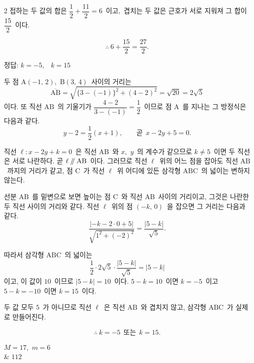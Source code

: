 \documentclass[10pt,fleqn]{article}
\newcommand{\para}{\mathbin{/\mskip-5mu/}}
\begin{document}
\begin{multicols*}{2}
접하는 두 값의 합은 $\dfrac12+\dfrac{11}{2}=6$\ 이고,\ 겹치는 두 값은 근호가 서로 지워져 그 합이 $\dfrac{15}{2}$\ 이다.

$$\therefore\ 6+\dfrac{15}{2}=\dfrac{27}{2}.$$


\begin{dmanswerbox}
정답: $k=-5$,\ \ $k=15$
\end{dmanswerbox}

두 점 $\mathrm{A}(-1,\,2)$,\ $\mathrm{B}(3,\,4)$\ 사이의 거리는
$$\overline{\mathrm{AB}}=\sqrt{\{3-(-1)\}^{2}+(4-2)^{2}}=\sqrt{20}=2\sqrt5$$
이다. 또 직선 $\mathrm{AB}$\ 의 기울기가 $\dfrac{4-2}{3-(-1)}=\dfrac12$\ 이므로 점 $\mathrm{A}$\ 를 지나는 그 방정식은 다음과 같다.
$$y-2=\dfrac12(x+1),\qquad \text{곧}\ \ x-2y+5=0.$$

직선 $\ell:x-2y+k=0$\ 은 직선 $\mathrm{AB}$\ 와 $x$,\ $y$\ 의 계수가 같으므로 $k\ne 5$\ 이면 두 직선은 서로 나란하다. 곧 $\ell\para\mathrm{AB}$\ 이다. 그러므로 직선 $\ell$\ 위의 어느 점을 잡아도 직선 $\mathrm{AB}$\ 까지의 거리가 같고, 점 $\mathrm{C}$\ 가 직선 $\ell$\ 위 어디에 있든 삼각형 $\mathrm{ABC}$\ 의 넓이는 변하지 않는다.

선분 $\mathrm{AB}$\ 를 밑변으로 보면 높이는 점 $\mathrm{C}$\ 와 직선 $\mathrm{AB}$\ 사이의 거리이고, 그것은 나란한 두 직선 사이의 거리와 같다. 직선 $\ell$\ 위의 점 $(-k,\,0)$\ 을 잡으면 그 거리는 다음과 같다.
$$\dfrac{|-k-2\cdot 0+5|}{\sqrt{1^{2}+(-2)^{2}}}=\dfrac{|5-k|}{\sqrt5}.$$

따라서 삼각형 $\mathrm{ABC}$\ 의 넓이는
$$\dfrac12\cdot 2\sqrt5\cdot\dfrac{|5-k|}{\sqrt5}=|5-k|$$
이고, 이 값이 $10$\ 이므로 $|5-k|=10$\ 이다. $5-k=10$\ 이면 $k=-5$\ 이고 $5-k=-10$\ 이면 $k=15$\ 이다.

두 값 모두 $5$\ 가 아니므로 직선 $\ell$\ 은 직선 $\mathrm{AB}$\ 와 겹치지 않고, 삼각형 $\mathrm{ABC}$\ 가 실제로 만들어진다.

$$\therefore\ k=-5\ \ \text{또는}\ \ k=15.$$


\begin{dmanslist}
 $M=17$,\ $m=6$\\
&  $112$
\end{dmanslist}


\end{multicols*}
\end{document}
